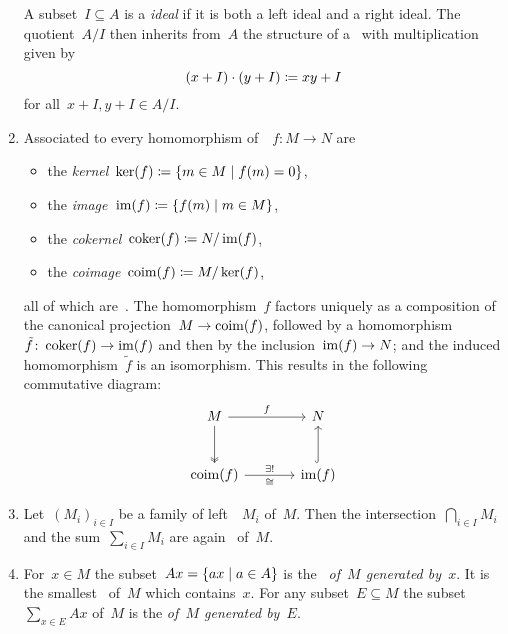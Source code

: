 \begin{remarkdefinition}
\begin{enumerate}
      A subset~$I \subseteq A$ is a \emph{{\twosided} ideal} if it is both a left ideal and a right ideal.
      The quotient~$A/I$ then inherits from~$A$ the structure of a~{\kalg} with multiplication given by
      \[
                  (x + I) \cdot (y + I)
        \coloneqq  xy + I
      \]
      for all~$x + I, y + I \in A/I$.
    \item
      Associated to every homomorphism of~{\Amods}~$f \colon M \to N$ are
      \begin{itemize}
        \item
          the \emph{kernel}~$\ker(f) \defined \{m \in M \suchthat f(m) = 0\}$,
        \item
          the \emph{image}~$\im(f) \defined \{f(m) \suchthat m \in M\}$,
        \item
          the \emph{cokernel}~$\operatorname{coker}(f) \coloneqq N/\operatorname{im}(f)$,
        \item
          the \emph{coimage}~$\operatorname{coim}(f) \coloneqq M/\ker(f)$,
      \end{itemize}
      all of which are~{\Amods}.
      The homomorphism~$f$ factors uniquely as a composition of the canonical projection~$M \to \operatorname{coim}(f)$, followed by a homomorphism~$\tilde{f} \colon \operatorname{coker}(f) \to \operatorname{im}(f)$ and then by the inclusion~$\operatorname{im}(f) \to N$; and the induced homomorphism~$\tilde{f}$ is an isomorphism.
      This results in the following commutative diagram:
      \[
        \begin{tikzcd}[sep = large]
            M
            \arrow{r}[above]{f}
            \arrow[two heads]{d}
          & N
          \\
            \coim(f)
            \arrow{r}[above]{\exists!}[below]{\cong}
          & \im(f)
            \arrow[hook]{u}
        \end{tikzcd}
      \]
    \item
      Let~$(M_i)_{i \in I}$ be a family of left~{\Asmods}~$M_i$ of~$M$.
      Then the intersection~$\bigcap_{i \in I} M_i$ and the sum~$\sum_{i \in I} M_i$ are again~{\Asmods} of~$M$.
    \item
      For~$x \in M$ the subset~$Ax = \{ax \suchthat a \in A\}$ is the~\emph{{\Asmod} of~$M$ generated by~$x$}.
      It is the smallest~{\Asmod} of~$M$ which contains~$x$.
      For any subset~$E \subseteq M$ the subset~$\sum_{x \in E} Ax$ of~$M$ is the \emph{{\Asmod} of~$M$ generated by~$E$}.

\end{enumerate}
\end{remarkdefinition}
